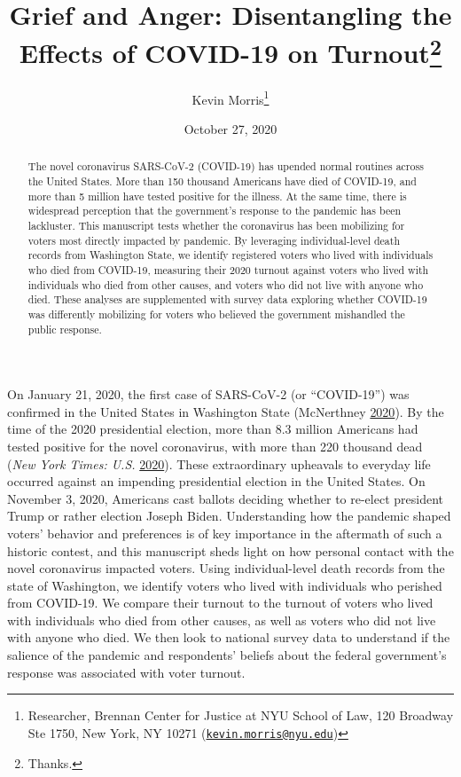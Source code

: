 \documentclass[
  12pt,
]{article}
\title{Grief and Anger: Disentangling the Effects of COVID-19 on Turnout\thanks{Thanks.}}
\author{Kevin Morris\footnote{Researcher, Brennan Center for Justice at NYU School of Law, 120 Broadway Ste 1750, New York, NY 10271 (\href{mailto:kevin.morris@nyu.edu}{\nolinkurl{kevin.morris@nyu.edu}})}}
\date{October 27, 2020}
\begin{document}
\maketitle
\begin{abstract}
The novel coronavirus SARS-CoV-2 (COVID-19) has upended normal routines across the United States. More than 150 thousand Americans have died of COVID-19, and more than 5 million have tested positive for the illness. At the same time, there is widespread perception that the government's response to the pandemic has been lackluster. This manuscript tests whether the coronavirus has been mobilizing for voters most directly impacted by pandemic. By leveraging individual-level death records from Washington State, we identify registered voters who lived with individuals who died from COVID-19, measuring their 2020 turnout against voters who lived with individuals who died from other causes, and voters who did not live with anyone who died. These analyses are supplemented with survey data exploring whether COVID-19 was differently mobilizing for voters who believed the government mishandled the public response.
\end{abstract}

\pagebreak


On January 21, 2020, the first case of SARS-CoV-2 (or ``COVID-19'') was confirmed in the United States in Washington State (McNerthney \protect\hyperlink{ref-McNerthney2020}{2020}). By the time of the 2020 presidential election, more than 8.3 million Americans had tested positive for the novel coronavirus, with more than 220 thousand dead (\emph{New York Times: U.S.} \protect\hyperlink{ref-nyt2020}{2020}). These extraordinary upheavals to everyday life occurred against an impending presidential election in the United States. On November 3, 2020, Americans cast ballots deciding whether to re-elect president Trump or rather election Joseph Biden. Understanding how the pandemic shaped voters' behavior and preferences is of key importance in the aftermath of such a historic contest, and this manuscript sheds light on how personal contact with the novel coronavirus impacted voters. Using individual-level death records from the state of Washington, we identify voters who lived with individuals who perished from COVID-19. We compare their turnout to the turnout of voters who lived with individuals who died from other causes, as well as voters who did not live with anyone who died. We then look to national survey data to understand if the salience of the pandemic and respondents' beliefs about the federal government's response was associated with voter turnout.
\end{document}
